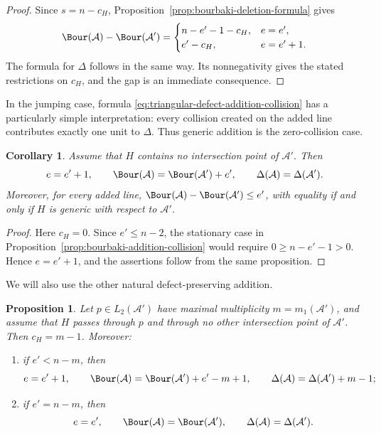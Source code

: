 \documentclass[11pt]{amsart}   %
\newtheorem{Corollary}[Theorem]{Corollary}
\newtheorem{Proposition}[Theorem]{Proposition}
\theoremstyle{definition}
\def\A{{\mathcal A}}
\begin{document}
\begin{proof}
Since $s=n-c_H$, Proposition~\ref{prop:bourbaki-deletion-formula} gives
\[
\Bour(\A)-\Bour(\A')
=
\begin{cases}
n-e'-1-c_H,&e=e',\\ e'-c_H,&e=e'+1.
\end{cases}
\]
The formula for $\Delta$ follows in the same way. Its nonnegativity gives the stated restrictions on $c_H$, and the gap is an immediate consequence.
\end{proof}

In the jumping case, formula \eqref{eq:triangular-defect-addition-collision} has a particularly simple interpretation: every collision created on the added line contributes exactly one unit to $\Delta$. Thus generic addition is the zero-collision case.

\begin{Corollary}
\label{cor:generic-line-bourbaki-addition}
Assume that $H$ contains no intersection point of $\A'$. Then
\[
e=e'+1,\qquad
\Bour(\A)=\Bour(\A')+e',
\qquad
\Delta(\A)=\Delta(\A').
\]
Moreover, for every added line, $\Bour(\A)-\Bour(\A')\leq e'$, with equality if and only if $H$ is generic with respect to $\A'$.
\end{Corollary}

\begin{proof}
Here $c_H=0$. Since $e'\leq n-2$, the stationary case in Proposition~\ref{prop:bourbaki-addition-collision} would require $0\geq n-e'-1>0$. Hence $e=e'+1$, and the assertions follow from the same proposition.
\end{proof}

We will also use the other natural defect-preserving addition.

\begin{Proposition}
\label{prop:addition-through-maximal-point}
Let $p\in L_2(\A')$ have maximal multiplicity $m=m_1(\A')$, and assume that $H$ passes through $p$ and through no other intersection point of $\A'$. Then $c_H=m-1$. Moreover:
\begin{enumerate}
\item if $e'<n-m$, then
\[
e=e'+1,\qquad
\Bour(\A)=\Bour(\A')+e'-m+1,
\qquad
\Delta(\A)=\Delta(\A')+m-1;
\]

\item if $e'=n-m$, then
\[
e=e',\qquad
\Bour(\A)=\Bour(\A'),
\qquad
\Delta(\A)=\Delta(\A').
\]
\end{enumerate}
\end{Proposition}
\end{document}

